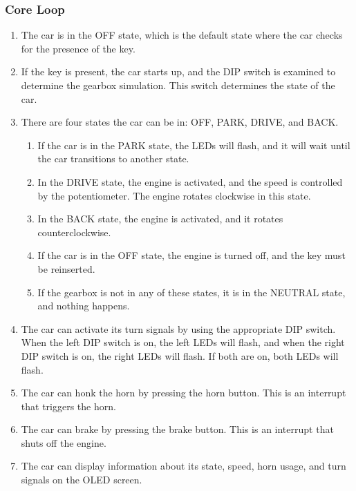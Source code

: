 \subsubsection{Core Loop}
\begin{enumerate}
    \item The car is in the OFF state, which is the default state where the car checks for the presence of the key.
    \item If the key is present, the car starts up, and the DIP switch is examined to determine the gearbox simulation. This switch determines the state of the car.
    \item There are four states the car can be in: OFF, PARK, DRIVE, and BACK.
    \begin{enumerate}
        \item If the car is in the PARK state, the LEDs will flash, and it will wait until the car transitions to another state.
        \item In the DRIVE state, the engine is activated, and the speed is controlled by the potentiometer. The engine rotates clockwise in this state.
        \item In the BACK state, the engine is activated, and it rotates counterclockwise.
        \item If the car is in the OFF state, the engine is turned off, and the key must be reinserted.
        \item If the gearbox is not in any of these states, it is in the NEUTRAL state, and nothing happens.
    \end{enumerate}
    \item The car can activate its turn signals by using the appropriate DIP switch. When the left DIP switch is on, the left LEDs will flash, and when the right DIP switch is on, the right LEDs will flash. If both are on, both LEDs will flash.
    \item The car can honk the horn by pressing the horn button. This is an interrupt that triggers the horn.
    \item The car can brake by pressing the brake button. This is an interrupt that shuts off the engine.
    \item The car can display information about its state, speed, horn usage, and turn signals on the OLED screen.
\end{enumerate}